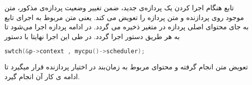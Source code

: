 تابع
هنگام اجرا کردن یک پردازه‌ی جدید، ضمن تغییر وضعیت پردازه‌ی مذکور، متن موجود روی پردازنده و متن پردازه را تعویض می کند. یعنی متن مربوط به اجرای تابع
به جای محتوای اصلی پردازه در متغیر
ذخیره می گردد. در ادامه پردازه اجرا می‌شود تا به هر طریق دستور
اجرا گردد. در طی این اجرا نهایتا با دستور
\begin{lstlisting}[language=c++]
swtch(&p->context , mycpu()->scheduler);
\end{lstlisting}
تعویض متن انجام گرفته و محتوای مربوط به زمان‌بند در اختیار پردازنده قرار میگیرد تا ادامه ی کار آن انجام گیرد.